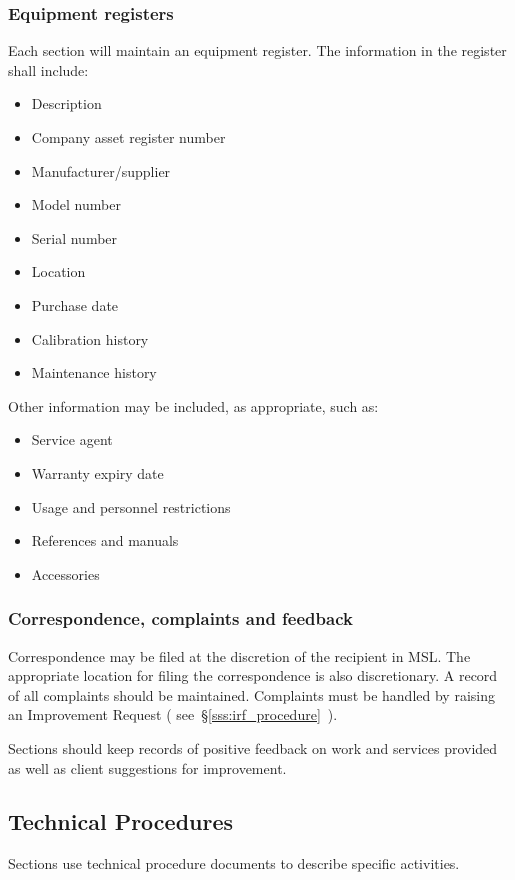 \subsubsection{Equipment registers}
\label{sss:equipment_register}
Each section will maintain an equipment register. The information in the register shall include: 
\begin{itemize}
\item Description 
\item Company asset register number 
\item Manufacturer/supplier 
\item Model number 
\item Serial number 
\item Location
\item Purchase date 
\item Calibration history 
\item Maintenance history
\end{itemize}
Other information may be included, as appropriate, such as:
\begin{itemize}\item Service agent 
\item Warranty expiry date 
\item Usage and personnel restrictions
\item References and manuals
\item Accessories
\end{itemize}

\subsubsection{Correspondence, complaints and feedback}
Correspondence may be filed at the discretion of the recipient in MSL. The appropriate location for filing the correspondence is also discretionary. 
A record of all complaints should be maintained. Complaints must be handled by raising an Improvement Request ( see~\S\ref{sss:irf_procedure}~).

Sections should keep records of positive feedback on work and services provided as well as client suggestions for improvement.

\subsection{Technical Procedures}
\label{ss:technical_procedures}
Sections use technical procedure documents to describe specific activities.

